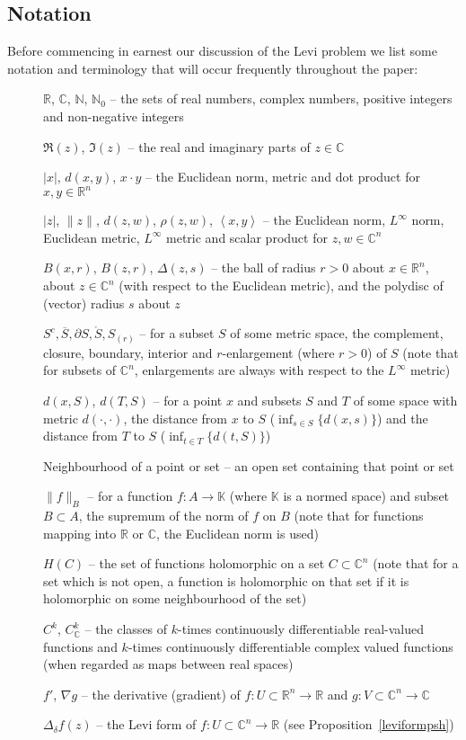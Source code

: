 \documentclass[11pt,a4paper, final, twoside]{article}
\numberwithin{equation}{section}
\newcommand{\C}{\mathbb C}
\newcommand{\R}{\mathbb R}
\newcommand{\RC}{\mathbb K}
\newcommand{\N}{\mathbb N}
\newcommand{\clos}[1]{\overline{#1}}
\newcommand{\bd}{\partial}
\newcommand{\inter}[1]{\mathring{#1}}
\newcommand{\ball}{B}
\newcommand{\pdisc}{\Delta}
\newcommand{\pmetric}{\rho}
\newcommand{\emetric}{d}
\newcommand{\hol}{H}
\newcommand{\cts}{C}
\newcommand{\ccts}{C_{\mathbb C}}
\renewcommand{\sp}[2]{\left<#1,#2\right>}
\newcommand{\sprod}[2]{\sp{#1}{#2}}
\newcommand{\grad}[1]{#1'}
\newcommand{\cgrad}[1]{\nabla #1}
\begin{document}
\subsection{Notation}
\label{blabs}
Before commencing in earnest our discussion of the Levi problem we list some notation and terminology that will occur frequently throughout the paper:
\begin{description}
\item[]{$\R$, $\C$, $\N$, $\N_0$ -- the sets of real numbers, complex numbers, positive integers and non-negative integers}
\item[]{$\Re(z)$, $\Im(z)$ -- the real and imaginary parts of $z\in\C$}
\item[]{$|x|$, $\emetric(x,y)$, $x\cdot y$ -- the Euclidean norm, metric and dot product for $x,y\in\R^n$}
\item[]{$|z|$, $\|z\|$, $\emetric(z,w)$, $\pmetric(z,w)$, $\sprod{x}{y}$ -- the Euclidean norm, $L^\infty$ norm, Euclidean metric, $L^\infty$ metric and scalar product for $z,w\in\C^n$}
\item[]{$\ball(x,r)$, $\ball(z,r)$, $\pdisc(z,s)$ -- the ball of radius $r>0$ about $x\in\R^n$, about $z\in\C^n$ (with respect to the Euclidean metric), and the polydisc of (vector) radius $s$ about
$z$}
\item[]{$S^c, \clos{S}, \bd S, \inter{S}, S_{(r)}$ -- for a subset $S$ of some metric space, the complement, closure, boundary, interior and $r$-enlargement (where $r>0$) of $S$ (note that for subsets of $\C^n$, enlargements are always with respect to the $L^\infty$ metric)}
\item[]{$\emetric(x,S)$, $\emetric(T,S)$ -- for a point $x$ and subsets $S$ and $T$ of some space with metric $d(\cdot,\cdot)$, the distance from $x$ to $S$ ($\inf_{s\in S}\{d(x,s)\}$) and
the distance from $T$ to $S$ ($\inf_{t\in T}\{\emetric(t,S)\}$)}
\item[]{Neighbourhood of a point or set -- an open set containing that point or set}
\item[]{$\|f\|_B$ -- for a function $f\colon A\to\RC$ (where $\RC$ is a normed space) and subset $B\subset A$, the supremum of the norm of $f$ on $B$ (note that for functions mapping into $\R$ or $\C$, the Euclidean
norm is used)} 
\item[]{$\hol(C)$ -- the set of functions holomorphic on a set $C\subset\C^n$ (note that for a set which is not open, a function is holomorphic on that set if it is holomorphic on some neighbourhood of the set)}
\item[]{$\cts^k$, $\ccts^k$ -- the classes of $k$-times continuously differentiable real-valued functions and $k$-times continuously differentiable complex valued functions (when regarded as maps between real spaces)}
\item[]{$\grad{f}$, $\cgrad{g}$ -- the derivative (gradient) of $f\colon U\subset\R^n\to\R$ and $g\colon V\subset\C^n\to\C$}
\item[]{$\Delta_\delta f(z)$ -- the Levi form of $f\colon U\subset\C^n\to\R$ (see Proposition~\ref{leviformpsh})}
\end{description}
\end{document}
